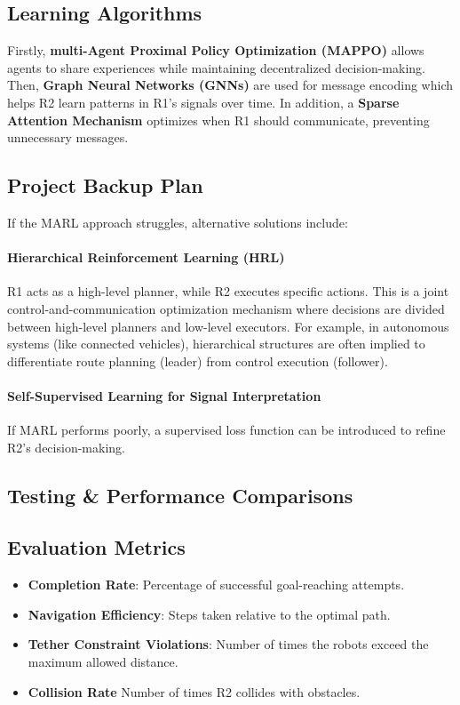 \documentclass[a4paper,11pt]{article}
\begin{document}
\subsection{Learning Algorithms}

Firstly, \textbf{multi-Agent Proximal Policy Optimization (MAPPO)} \cite{NeurIPS2021} allows agents to share experiences while maintaining decentralized decision-making. Then, \textbf{Graph Neural Networks (GNNs)} \cite{lowe2020multiagent} are used for message encoding which helps R2 learn patterns in R1’s signals over time. In addition, a \textbf{Sparse Attention Mechanism} \cite{das2019tarmac} optimizes when R1 should communicate, preventing unnecessary messages.

\subsection{Project Backup Plan} 
If the MARL approach struggles, alternative solutions include:
\paragraph{Hierarchical Reinforcement Learning (HRL)} R1 acts as a high-level planner, while R2 executes specific actions. This is a joint control-and-communication optimization mechanism where decisions are divided between high-level planners and low-level executors. \cite{deepRL-joint-trajectory-communication-IoT} For example, in autonomous systems (like connected vehicles), hierarchical structures are often implied to differentiate route planning (leader) from control execution (follower).

\paragraph{Self-Supervised Learning for Signal Interpretation} If MARL performs poorly, a supervised loss function can be introduced to refine R2’s decision-making. 

\subsection{Testing \& Performance Comparisons}
\subsection{Evaluation Metrics} 
\begin{itemize}
    \item \textbf{Completion Rate}: Percentage of successful goal-reaching attempts.
    \item \textbf{Navigation Efficiency}: Steps taken relative to the optimal path.
    \item \textbf{Tether Constraint Violations}: Number of times the robots exceed the maximum allowed distance.
    \item \textbf{Collision Rate} Number of times R2 collides with obstacles.
\end{itemize}
\end{document}

